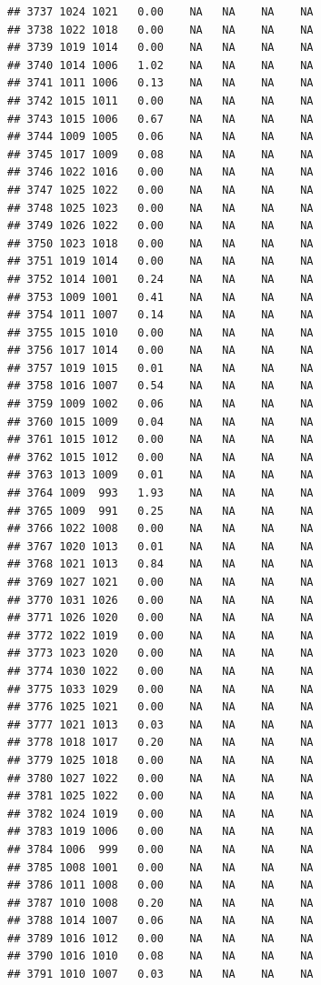 \documentclass{article}\usepackage{graphicx, color}
\makeatletter
\newenvironment{kframe}{%
 \def\at@end@of@kframe{}%
 \ifinner\ifhmode%
  \def\at@end@of@kframe{\end{minipage}}%
  \begin{minipage}{\columnwidth}%
 \fi\fi%
 \def\FrameCommand##1{\hskip\@totalleftmargin \hskip-\fboxsep
 \colorbox{shadecolor}{##1}\hskip-\fboxsep
     \hskip-\linewidth \hskip-\@totalleftmargin \hskip\columnwidth}%
 \MakeFramed {\advance\hsize-\width
   \@totalleftmargin\z@ \linewidth\hsize
   \@setminipage}}%
 {\par\unskip\endMakeFramed%
 \at@end@of@kframe}
\newenvironment{knitrout}{}{} %
\makeatother
\begin{document}
\begin{knitrout}
\begin{kframe}
\begin{verbatim}
## 3737 1024 1021   0.00    NA   NA    NA    NA
## 3738 1022 1018   0.00    NA   NA    NA    NA
## 3739 1019 1014   0.00    NA   NA    NA    NA
## 3740 1014 1006   1.02    NA   NA    NA    NA
## 3741 1011 1006   0.13    NA   NA    NA    NA
## 3742 1015 1011   0.00    NA   NA    NA    NA
## 3743 1015 1006   0.67    NA   NA    NA    NA
## 3744 1009 1005   0.06    NA   NA    NA    NA
## 3745 1017 1009   0.08    NA   NA    NA    NA
## 3746 1022 1016   0.00    NA   NA    NA    NA
## 3747 1025 1022   0.00    NA   NA    NA    NA
## 3748 1025 1023   0.00    NA   NA    NA    NA
## 3749 1026 1022   0.00    NA   NA    NA    NA
## 3750 1023 1018   0.00    NA   NA    NA    NA
## 3751 1019 1014   0.00    NA   NA    NA    NA
## 3752 1014 1001   0.24    NA   NA    NA    NA
## 3753 1009 1001   0.41    NA   NA    NA    NA
## 3754 1011 1007   0.14    NA   NA    NA    NA
## 3755 1015 1010   0.00    NA   NA    NA    NA
## 3756 1017 1014   0.00    NA   NA    NA    NA
## 3757 1019 1015   0.01    NA   NA    NA    NA
## 3758 1016 1007   0.54    NA   NA    NA    NA
## 3759 1009 1002   0.06    NA   NA    NA    NA
## 3760 1015 1009   0.04    NA   NA    NA    NA
## 3761 1015 1012   0.00    NA   NA    NA    NA
## 3762 1015 1012   0.00    NA   NA    NA    NA
## 3763 1013 1009   0.01    NA   NA    NA    NA
## 3764 1009  993   1.93    NA   NA    NA    NA
## 3765 1009  991   0.25    NA   NA    NA    NA
## 3766 1022 1008   0.00    NA   NA    NA    NA
## 3767 1020 1013   0.01    NA   NA    NA    NA
## 3768 1021 1013   0.84    NA   NA    NA    NA
## 3769 1027 1021   0.00    NA   NA    NA    NA
## 3770 1031 1026   0.00    NA   NA    NA    NA
## 3771 1026 1020   0.00    NA   NA    NA    NA
## 3772 1022 1019   0.00    NA   NA    NA    NA
## 3773 1023 1020   0.00    NA   NA    NA    NA
## 3774 1030 1022   0.00    NA   NA    NA    NA
## 3775 1033 1029   0.00    NA   NA    NA    NA
## 3776 1025 1021   0.00    NA   NA    NA    NA
## 3777 1021 1013   0.03    NA   NA    NA    NA
## 3778 1018 1017   0.20    NA   NA    NA    NA
## 3779 1025 1018   0.00    NA   NA    NA    NA
## 3780 1027 1022   0.00    NA   NA    NA    NA
## 3781 1025 1022   0.00    NA   NA    NA    NA
## 3782 1024 1019   0.00    NA   NA    NA    NA
## 3783 1019 1006   0.00    NA   NA    NA    NA
## 3784 1006  999   0.00    NA   NA    NA    NA
## 3785 1008 1001   0.00    NA   NA    NA    NA
## 3786 1011 1008   0.00    NA   NA    NA    NA
## 3787 1010 1008   0.20    NA   NA    NA    NA
## 3788 1014 1007   0.06    NA   NA    NA    NA
## 3789 1016 1012   0.00    NA   NA    NA    NA
## 3790 1016 1010   0.08    NA   NA    NA    NA
## 3791 1010 1007   0.03    NA   NA    NA    NA

\end{verbatim}
\end{kframe}
\end{knitrout}
\end{document}
